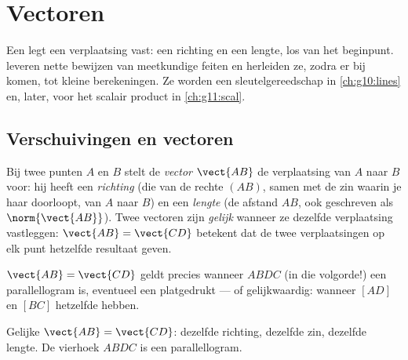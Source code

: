 \chapter{Vectoren}\label{ch:g10:vectors}

Een  legt een verplaatsing vast: een richting en een lengte, los van
het beginpunt.  leveren nette bewijzen van meetkundige feiten en
herleiden ze, zodra er  bij komen, tot kleine berekeningen. Ze
worden een sleutelgereedschap in \cref{ch:g10:lines} en, later, voor het
scalair product in \cref{ch:g11:scal}.

\section{Verschuivingen en vectoren}

\begin{definition}[Vector]\label{def:g10:vectors:vector}
Bij twee punten $A$ en $B$ stelt de \emph{vector} $\vect{AB}$
de verplaatsing van $A$ naar $B$ voor: hij heeft een \emph{richting} (die van
de rechte $(AB)$, samen met de zin waarin je haar doorloopt, van $A$ naar
$B$) en een \emph{lengte} (de afstand $AB$, ook geschreven als
$\norm{\vect{AB}}$). Twee vectoren zijn \emph{gelijk} wanneer ze dezelfde
verplaatsing vastleggen: $\vect{AB} = \vect{CD}$ betekent dat de twee
verplaatsingen op elk punt hetzelfde resultaat geven.
\end{definition}

\begin{proposition}\label{prop:g10:vectors:parallelogram}
$\vect{AB} = \vect{CD}$ geldt precies wanneer $ABDC$ (in die volgorde!) een
parallellogram is, eventueel een platgedrukt --- of gelijkwaardig: wanneer
$[AD]$ en $[BC]$ hetzelfde  hebben.
\end{proposition}
\admitted

\begin{omfigure}

{\small Gelijke  $\vect{AB} = \vect{CD}$: dezelfde richting, dezelfde
zin, dezelfde lengte. De vierhoek $ABDC$ is een parallellogram.}
\end{omfigure}

